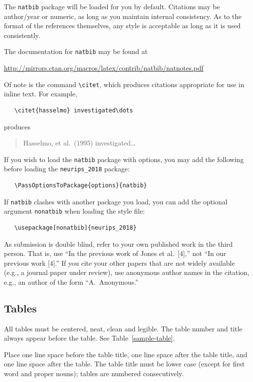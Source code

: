 \documentclass{article}
\begin{document}
The \verb+natbib+ package will be loaded for you by default.  Citations may be
author/year or numeric, as long as you maintain internal consistency.  As to the
format of the references themselves, any style is acceptable as long as it is
used consistently.

The documentation for \verb+natbib+ may be found at
\begin{center}
  \url{http://mirrors.ctan.org/macros/latex/contrib/natbib/natnotes.pdf}
\end{center}
Of note is the command \verb+\citet+, which produces citations appropriate for
use in inline text.  For example,
\begin{verbatim}
   \citet{hasselmo} investigated\dots
\end{verbatim}
produces
\begin{quote}
  Hasselmo, et al.\ (1995) investigated\dots
\end{quote}

If you wish to load the \verb+natbib+ package with options, you may add the
following before loading the \verb+neurips_2018+ package:
\begin{verbatim}
   \PassOptionsToPackage{options}{natbib}
\end{verbatim}

If \verb+natbib+ clashes with another package you load, you can add the optional
argument \verb+nonatbib+ when loading the style file:
\begin{verbatim}
   \usepackage[nonatbib]{neurips_2018}
\end{verbatim}

As submission is double blind, refer to your own published work in the third
person. That is, use ``In the previous work of Jones et al.\ [4],'' not ``In our
previous work [4].'' If you cite your other papers that are not widely available
(e.g., a journal paper under review), use anonymous author names in the
citation, e.g., an author of the form ``A.\ Anonymous.''

\subsection{Tables}

All tables must be centered, neat, clean and legible.  The table number and
title always appear before the table.  See Table~\ref{sample-table}.

Place one line space before the table title, one line space after the
table title, and one line space after the table. The table title must
be lower case (except for first word and proper nouns); tables are
numbered consecutively.
\end{document}

